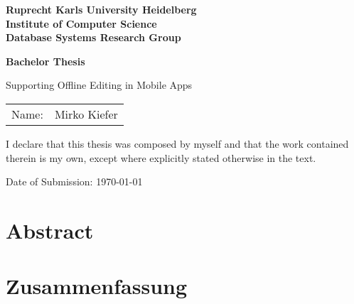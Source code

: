 \documentclass[
     12pt,         %
     a4paper,      %
     BCOR10mm,     %
     DIV14,        %
     liststotoc,   %
     bibtotoc,     %
     idxtotoc,     %
     ]{scrreprt}
\begin{document}
\begin{titlepage}


\vspace*{1cm}
\begin{center}
\vspace*{3cm}
\textbf{ 
\Large Ruprecht Karls University Heidelberg\\
\smallskip
\Large Institute of Computer Science\\
\smallskip
\Large Database Systems Research Group\\
\smallskip
}

\vspace{3cm}

\textbf{\large Bachelor Thesis} %

\vspace{0.5\baselineskip}
{\huge
Supporting Offline Editing in Mobile Apps
}
\end{center}

\vfill 

{\large
\begin{tabular}[l]{ll}
Name: & Mirko Kiefer\\
\end{tabular}
}

\end{titlepage}

\onehalfspacing

\thispagestyle{empty}

\vspace*{100pt}
I declare that this thesis was composed by myself and that the work contained therein is my
own, except where explicitly stated otherwise in the text.

\vspace*{50pt}


Date of Submission: \today
\newpage

\chapter*{Abstract}

\newpage

\chapter*{Zusammenfassung}

\newpage
\end{document}
